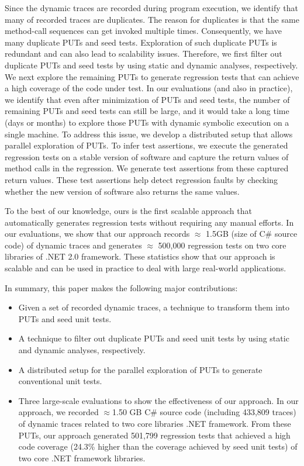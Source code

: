 Since the dynamic traces are recorded during program execution, we identify that many of recorded traces are duplicates. The reason for duplicates is that the same method-call sequences can get invoked multiple times. Consequently, we have many duplicate PUTs and seed tests. Exploration of such duplicate PUTs is redundant and can also lead to scalability issues. Therefore, we first filter out duplicate PUTs and seed tests by using static and dynamic analyses, respectively. We next explore the remaining PUTs to generate regression tests that can achieve a high coverage of the code under test. In our evaluations (and also in practice), we identify that even after minimization of PUTs and seed tests, the number of remaining PUTs and seed tests can still be large, and it would take a long time (days or months) to explore those PUTs with dynamic symbolic execution on a single machine. To address this issue, we develop a distributed setup that allows parallel exploration of PUTs. To infer test assertions, we execute the generated regression tests on a stable version of software and capture the return values of method calls in the regression. We generate test assertions from these captured
return values. These test assertions help detect regression faults by checking whether the new version of software also returns the same values.

To the best of our knowledge, ours is the first scalable approach that automatically generates regression tests without requiring any manual efforts. In our evaluations, we show that our approach records $\approx$ 1.5GB (size of C\# source code) of dynamic traces and generates $\approx$ 500,000 regression tests on two core libraries of .NET 2.0 framework. These statistics show that our approach is scalable and can be used in practice to deal with large real-world applications.

In summary, this paper makes the following major contributions:

\begin{itemize}
\item Given a set of recorded dynamic traces, a technique to transform them into PUTs and seed unit tests.
\item A technique to filter out duplicate PUTs and seed unit tests by using static and dynamic analyses, respectively.
\item A distributed setup for the parallel exploration of PUTs to generate conventional unit tests.
\item Three large-scale evaluations to show the effectiveness of our approach. In our approach, we recorded $\approx$1.50 GB C\# source code (including 433,809 traces) of dynamic traces related to two core libraries .NET framework. From these PUTs, our approach generated 501,799 regression tests that achieved a high code coverage (24.3\% higher than the coverage achieved by seed unit tests) of two core .NET framework libraries.
\end{itemize}

